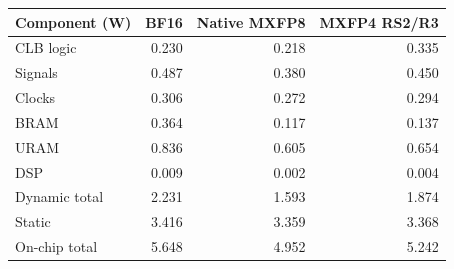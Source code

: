 \begin{tabular}{lrrr}
\toprule
Component (W) & BF16 & Native MXFP8 & MXFP4 RS2/R3 \\
\midrule
CLB logic & 0.230 & 0.218 & 0.335 \\
Signals & 0.487 & 0.380 & 0.450 \\
Clocks & 0.306 & 0.272 & 0.294 \\
BRAM & 0.364 & 0.117 & 0.137 \\
URAM & 0.836 & 0.605 & 0.654 \\
DSP & 0.009 & 0.002 & 0.004 \\
Dynamic total & 2.231 & 1.593 & 1.874 \\
Static & 3.416 & 3.359 & 3.368 \\
On-chip total & 5.648 & 4.952 & 5.242 \\
\bottomrule
\end{tabular}
